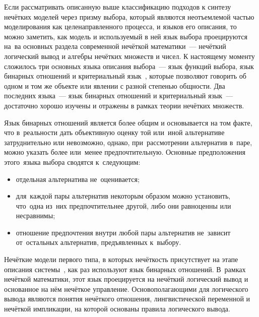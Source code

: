 
Если рассматривать описанную выше классификацию подходов к синтезу нечётких моделей через призму выбора, который являются неотъемлемой частью моделирования как целенаправленного процесса, и языков его описания, то можно заметить, как модель и используемый в ней язык выбора проецируются на~ва основных раздела современной нечёткой математики~--- нечёткий логический вывод и алгебры нечётких множеств и чисел. К настоящему моменту сложилось три основных языка описания выбора~--- язык функций выбора, язык бинарных отношений и критериальный язык~\cite{Choice_Languages}, которые позволяют говорить об одном и том же объекте или явлении с разной степенью общности. Два последних языка~--- язык бинарных отношений и критериальный язык~--- достаточно хорошо изучены и отражены в рамках теории нечётких множеств.

Язык бинарных отношений является более общим и основывается на том факте, что в~реальности дать объективную оценку той или~иной альтернативе затруднительно или невозможно, однако, при~рассмотрении альтернатив в~паре, можно указать более или~менее предпочтительную. Основные предположения этого~языка выбора сводятся к~следующим:
\begin{itemize}
	\item отдельная альтернатива не~оценивается;
	\item для~каждой пары альтернатив некоторым образом можно установить, что~одна из~них предпочтительнее другой, либо они равноценны или несравнимы;
	\item отношение предпочтения внутри любой пары альтернатив не~зависит от~остальных альтернатив, предъявленных к~выбору.
\end{itemize}

Нечёткие модели первого типа, в которых нечёткость присутствует на этапе описания системы~\cite{Choice_Languages}, как раз используют язык бинарных отношений. В~рамках нечёткой математики, этот язык проецируется на нечёткий логический вывод и основанное на нём нечёткое управление. Основополагающими для логического вывода являются понятия нечёткого отношения, лингвистической переменной и нечёткой импликации, на которой основаны правила логического вывода.

